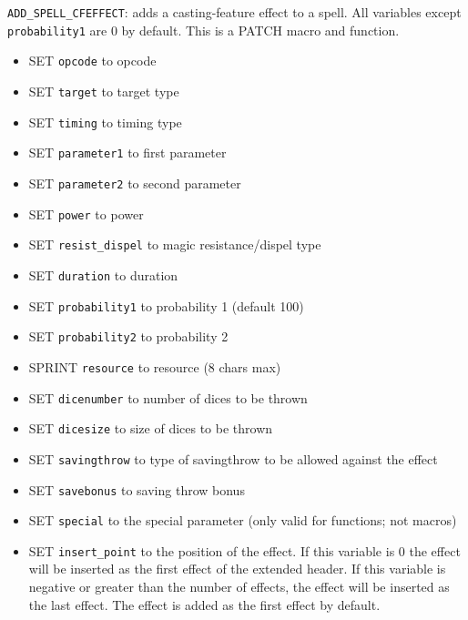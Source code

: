 \documentclass{article}
\begin{document}
\verb+ADD_SPELL_CFEFFECT+: adds a casting-feature effect to a spell. All variables except \verb+probability1+ are 0 by default.
This is a PATCH macro and function.
\begin{itemize}
\item SET \verb+opcode+ to opcode
\item SET \verb+target+ to target type
\item SET \verb+timing+ to timing type
\item SET \verb+parameter1+ to first parameter
\item SET \verb+parameter2+ to second parameter
\item SET \verb+power+ to power
\item SET \verb+resist_dispel+ to magic resistance/dispel type
\item SET \verb+duration+ to duration
\item SET \verb+probability1+ to probability 1 (default 100)
\item SET \verb+probability2+ to probability 2
\item SPRINT \verb+resource+ to resource (8 chars max)
\item SET \verb+dicenumber+ to number of dices to be thrown
\item SET \verb+dicesize+ to size of dices to be thrown
\item SET \verb+savingthrow+ to type of savingthrow to be allowed against the effect
\item SET \verb+savebonus+ to saving throw bonus
\item SET \verb+special+ to the special parameter (only valid for functions; not macros)
\item SET \verb+insert_point+ to the position of the effect. If this variable is 0 the effect will be inserted as the first effect of the extended header. If this variable is negative or greater than the number of effects, the effect will be inserted as the last effect. The effect is added as the first effect by default.
\end{itemize}
\end{document}
